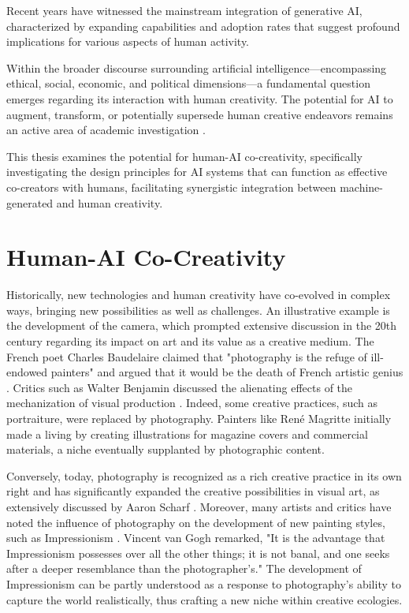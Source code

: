 Recent years have witnessed the mainstream integration of generative AI, characterized by expanding capabilities and adoption rates that suggest profound implications for various aspects of human activity.

Within the broader discourse surrounding artificial intelligence—encompassing ethical, social, economic, and political dimensions—a fundamental question emerges regarding its interaction with human creativity. The potential for AI to augment, transform, or potentially supersede human creative endeavors remains an active area of academic investigation \cite{Boden-2004, Runco-Jaeger-2012}.

This thesis examines the potential for human-AI co-creativity, specifically investigating the design principles for AI systems that can function as effective co-creators with humans, facilitating synergistic integration between machine-generated and human creativity.
 
\section{Human-AI Co-Creativity}

Historically, new technologies and human creativity have co-evolved in complex ways, bringing new possibilities as well as challenges. An illustrative example is the development of the camera, which prompted extensive discussion in the 20th century regarding its impact on art and its value as a creative medium. The French poet Charles Baudelaire claimed that "photography is the refuge of ill-endowed painters" and argued that it would be the death of French artistic genius \cite{Baudelaire-1955}. Critics such as Walter Benjamin discussed the alienating effects of the mechanization of visual production \cite{Benjamin-1935}. Indeed, some creative practices, such as portraiture, were replaced by photography. Painters like René Magritte initially made a living by creating illustrations for magazine covers and commercial materials, a niche eventually supplanted by photographic content.

Conversely, today, photography is recognized as a rich creative practice in its own right and has significantly expanded the creative possibilities in visual art, as extensively discussed by Aaron Scharf \cite{Scharf-1968}. Moreover, many artists and critics have noted the influence of photography on the development of new painting styles, such as Impressionism \cite{Sontag-1978}. Vincent van Gogh remarked, "It is the advantage that Impressionism possesses over all the other things; it is not banal, and one seeks after a deeper resemblance than the photographer's." The development of Impressionism can be partly understood as a response to photography's ability to capture the world realistically, thus crafting a new niche within creative ecologies.


